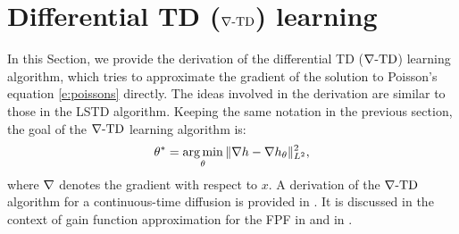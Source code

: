% 
\section{Differential TD ($\nabla\text{-TD}$) learning}
\label{s:diff_td_learning}
In this Section, we provide the derivation of the differential TD ($\nabla\text{-TD}$) learning algorithm, which tries to approximate the gradient of the solution to Poisson's equation \eqref{e:poissons} directly. The ideas involved in the derivation are similar to those in the LSTD algorithm. Keeping the same notation in the previous section, the goal of the $\nabla\text{-TD}$ learning algorithm is:
\begin{equation}
\param^* = \argmin_\param \| \grad h -\grad h_\param\|^2_{L^2},
\label{e:gradTD_norm_error}
\end{equation}
where $\nabla$ denotes the gradient with respect to $x$. A derivation of the $\nabla\text{-TD}$ algorithm for a continuous-time diffusion is provided in \cite{devmey16arXiv}. It is discussed in the context of gain function approximation for the FPF in  and in \cite{raddevmey16}.  

